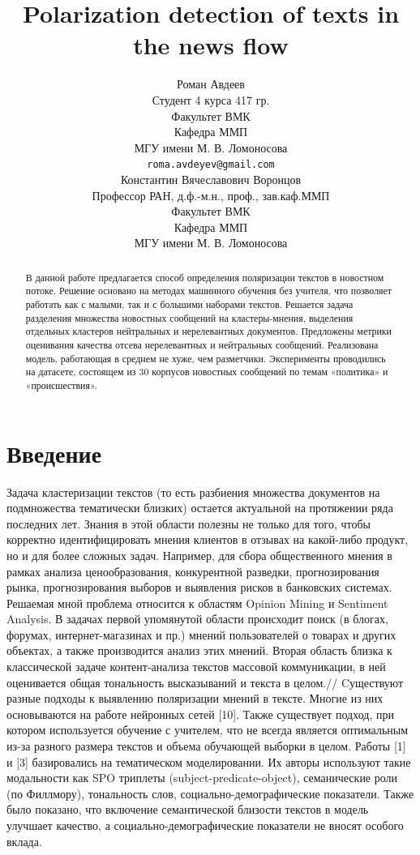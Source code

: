 \documentclass{article}
\title{Polarization detection of texts in the news flow}
\author{Роман Авдеев \\
	Студент 4 курса 417 гр.\\
	Факультет ВМК\\
        Кафедра ММП\\
	МГУ имени М. В. Ломоносова \\
	\texttt{roma.avdeyev@gmail.com} \\
	\And
	Константин Вячеславович Воронцов\\
        Профессор РАН, д.ф.-м.н., проф., зав.каф.ММП\\
	Факультет ВМК\\
        Кафедра ММП\\
	МГУ имени М. В. Ломоносова \\
}
\date{}
\begin{document}
\maketitle

\begin{abstract}
	В данной работе предлагается способ определения поляризации текстов в новостном потоке. Решение основано на методах машинного обучения без учителя, что позволяет работать как с малыми, так и с большими наборами текстов. Решается задача разделения множества новостных сообщений на кластеры-мнения, выделения отдельных кластеров нейтральных и нерелевантных документов. Предложены метрики оценивания качества отсева нерелевантных и нейтральных сообщений. Реализована модель, работающая в среднем не хуже, чем разметчики. Эксперименты проводились на датасете, состоящем из 30 корпусов новостных сообщений по темам «политика» и «происшествия».
\end{abstract}



\section{Введение}
Задача кластеризации текстов (то есть разбиения множества документов на подмножества тематически близких) остается актуальной на протяжении ряда последних лет. Знания в этой области полезны не только для того, чтобы корректно идентифицировать мнения клиентов в отзывах на какой-либо продукт, но и для более сложных задач. Например, для сбора общественного мнения в рамках анализа ценообразования, конкурентной разведки, прогнозирования рынка, прогнозирования выборов и выявления рисков в банковских системах. \\

Решаемая мной проблема относится к областям Opinion Mining и Sentiment Analysis. В задачах первой упомянутой области происходит поиск (в блогах, форумах, интернет-магазинах и пр.) мнений пользователей о товарах и других объектах, а также производится анализ этих мнений. Вторая область близка к классической задаче контент-анализа текстов массовой коммуникации, в ней оценивается общая тональность высказываний и текста в целом.//
Cуществуют разные подходы к выявлению поляризации мнений в тексте. Многие из них основываются на работе нейронных сетей [10]. Также существует подход, при котором используется обучение с учителем, что не всегда является оптимальным из-за разного размера текстов и объема обучающей выборки в целом. Работы [1] и [3] базировались на тематическом моделировании. Их авторы используют такие модальности как SPO триплеты (subject-predicate-object), семанические роли (по Филлмору), тональность слов, социально-демографические показатели. Также было показано, что включение семантической близости текстов в модель улучшает качество, а социально-демографические показатели не вносят особого вклада.\\
\end{document}
